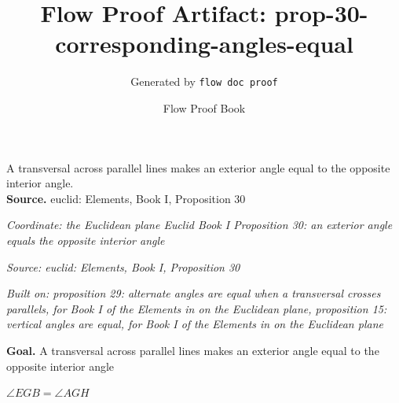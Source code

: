 \documentclass[11pt]{article}
\title{Flow Proof Artifact: prop-30-corresponding-angles-equal}
\author{Generated by \texttt{flow doc proof}}
\date{Flow Proof Book}
\theoremstyle{definition}
\begin{document}
\maketitle
A transversal across parallel lines makes an exterior angle equal to the opposite interior angle.\\[0.5em]
\textbf{Source.} euclid: Elements, Book I, Proposition 30\\[0.5em]
\bigskip
{}\par
\smallskip\noindent\textit{Coordinate: the Euclidean plane \cdot Euclid Book I \cdot Proposition 30: an exterior angle equals the opposite interior angle}\par
\smallskip\noindent\textit{Source: euclid: Elements, Book I, Proposition 30}\par
\smallskip\noindent\textit{Built on: proposition 29: alternate angles are equal when a transversal crosses parallels, for Book I of the Elements in on the Euclidean plane, proposition 15: vertical angles are equal, for Book I of the Elements in on the Euclidean plane}\par
\medskip
\noindent\textbf{Goal.} A transversal across parallel lines makes an exterior angle equal to the opposite interior angle\par
\noindent$\displaystyle \angle EGB = \angle AGH$\par
\medskip
\noindent
\end{document}
